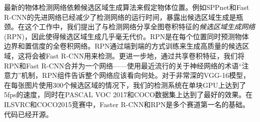 \documentclass[../main.tex]{subfile}
\begin{document}
最新的物体检测网络依赖候选区域生成算法来假定物体位置。例如SPPnet\cite{spp}和Fast R-CNN\cite{fastrcnn}的先进网络已经减少了检测网络的运行时间，暴露出候选区域生成是瓶颈。在这个工作中，我们提出了与检测网络分享全图卷积特征的\textit{候选区域生成网络}(RPN)，因此使得候选区域生成几乎毫无代价。RPN是在每个位置同时预测物体边界和置信度的全卷积网络。RPN通过端到端的方式训练来生成高质量的候选区域，这将会被Fast R-CNN用来检测。更进一步地，通过共享卷积特征，我们将RPN和Fast R-CNN合并为一个网络——使用最近流行的关于神经网络的术语“注意力”机制，RPN组件告诉整个网络应该看向何处。对于非常深的VGG-16\cite{vgg}模型，在每张图片使用300个候选区域的情况下，我们的检测系统在单块GPU上达到了5fps的速度，同时在PASCAL VOC 2017和COCO数据集上达到了最好的效果。在ILSVRC和COCO2015竞赛中，Faster R-CNN和RPN是多个赛道第一名的基础。代码已经开源。
\end{document}
